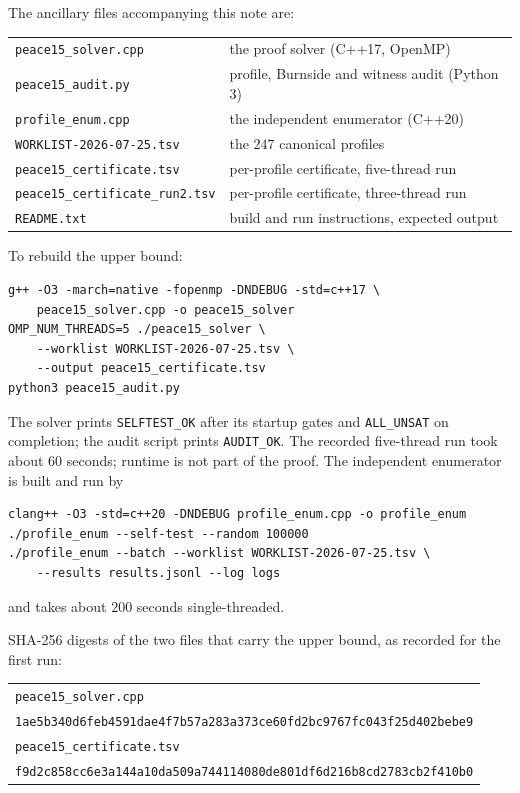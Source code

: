 \documentclass[11pt]{amsart}
\theoremstyle{remark}
\begin{document}
The ancillary files accompanying this note are:
\begin{center}
\begin{tabular}{@{}ll@{}}
\toprule
\texttt{peace15\_solver.cpp} & the proof solver (C++17, OpenMP)\\
\texttt{peace15\_audit.py} & profile, Burnside and witness audit (Python 3)\\
\texttt{profile\_enum.cpp} & the independent enumerator (C++20)\\
\texttt{WORKLIST-2026-07-25.tsv} & the $247$ canonical profiles\\
\texttt{peace15\_certificate.tsv} & per-profile certificate, five-thread run\\
\texttt{peace15\_certificate\_run2.tsv} & per-profile certificate, three-thread run\\
\texttt{README.txt} & build and run instructions, expected output\\
\bottomrule
\end{tabular}
\end{center}

To rebuild the upper bound:
\begin{verbatim}
g++ -O3 -march=native -fopenmp -DNDEBUG -std=c++17 \
    peace15_solver.cpp -o peace15_solver
OMP_NUM_THREADS=5 ./peace15_solver \
    --worklist WORKLIST-2026-07-25.tsv \
    --output peace15_certificate.tsv
python3 peace15_audit.py
\end{verbatim}
The solver prints \texttt{SELFTEST\_OK} after its startup gates and \texttt{ALL\_UNSAT} on completion; the audit script prints \texttt{AUDIT\_OK}. The recorded five-thread run took about $60$ seconds; runtime is not part of the proof. The independent enumerator is built and run by
\begin{verbatim}
clang++ -O3 -std=c++20 -DNDEBUG profile_enum.cpp -o profile_enum
./profile_enum --self-test --random 100000
./profile_enum --batch --worklist WORKLIST-2026-07-25.tsv \
    --results results.jsonl --log logs
\end{verbatim}
and takes about $200$ seconds single-threaded.

SHA-256 digests of the two files that carry the upper bound, as recorded for the first run:
\begin{center}\small
\begin{tabular}{@{}l@{}}
\toprule
\texttt{peace15\_solver.cpp}\\
\quad\texttt{1ae5b340d6feb4591dae4f7b57a283a373ce60fd2bc9767fc043f25d402bebe9}\\
\addlinespace
\texttt{peace15\_certificate.tsv}\\
\quad\texttt{f9d2c858cc6e3a144a10da509a744114080de801df6d216b8cd2783cb2f410b0}\\
\bottomrule
\end{tabular}
\end{center}
\end{document}
